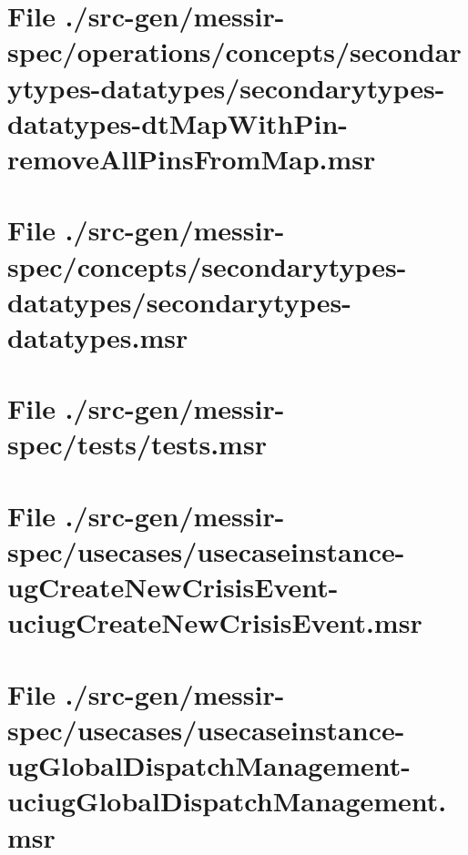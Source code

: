 \section[File /src-gen.../secondarytypes-datatypes-dtMapWithPin-removeAllPinsFromMap.msr]{File ./src-gen/messir-spec/operations/concepts/secondarytypes-datatypes/secondarytypes-datatypes-dtMapWithPin-removeAllPinsFromMap.msr}
\scriptsize

\normalsize
	
\section[File /src-gen/messir-spec/concepts.../secondarytypes-datatypes.msr]{File ./src-gen/messir-spec/concepts/secondarytypes-datatypes/secondarytypes-datatypes.msr}
\scriptsize

\normalsize
	
\section[File /src-gen/messir-spec/tests/tests.msr]{File ./src-gen/messir-spec/tests/tests.msr}
\scriptsize

\normalsize
	
\section[File /.../usecaseinstance-ugCreateNewCrisisEvent-uciugCreateNewCrisisEvent.msr]{File ./src-gen/messir-spec/usecases/usecaseinstance-ugCreateNewCrisisEvent-uciugCreateNewCrisisEvent.msr}
\scriptsize

\normalsize
	
\section[File /.../usecaseinstance-ugGlobalDispatchManagement-uciugGlobalDispatchManagement.msr]{File ./src-gen/messir-spec/usecases/usecaseinstance-ugGlobalDispatchManagement-uciugGlobalDispatchManagement.msr}
\scriptsize

\normalsize
	
